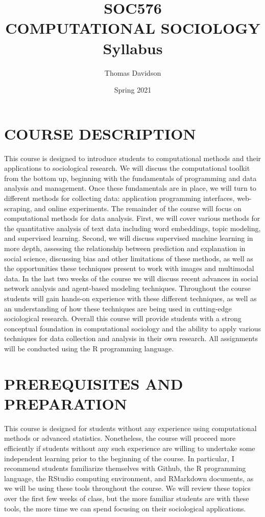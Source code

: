 \documentclass[
  10pt,
]{article}
\title{SOC576\\
\hspace*{0.333em}COMPUTATIONAL SOCIOLOGY\\
\hspace*{0.333em}Syllabus}
\author{Thomas Davidson}
\date{Spring 2021}
\begin{document}
\maketitle

\hypertarget{course-description}{%
\section{COURSE DESCRIPTION}\label{course-description}}

This course is designed to introduce students to computational methods
and their applications to sociological research. We will discuss the
computational toolkit from the bottom up, beginning with the
fundamentals of programming and data analysis and management. Once these
fundamentals are in place, we will turn to different methods for
collecting data: application programming interfaces, web-scraping, and
online experiments. The remainder of the course will focus on
computational methods for data analysis. First, we will cover various
methods for the quantitative analysis of text data including word
embeddings, topic modeling, and supervised learning. Second, we will
discuss supervised machine learning in more depth, assessing the
relationship between prediction and explanation in social science,
discussing bias and other limitations of these methods, as well as the
opportunities these techniques present to work with images and
multimodal data. In the last two weeks of the course we will discuss
recent advances in social network analysis and agent-based modeling
techniques. Throughout the course students will gain hands-on experience
with these different techniques, as well as an understanding of how
these techniques are being used in cutting-edge sociological research.
Overall this course will provide students with a strong conceptual
foundation in computational sociology and the ability to apply various
techniques for data collection and analysis in their own research. All
assignments will be conducted using the R programming language.

\hypertarget{prerequisites-and-preparation}{%
\section{PREREQUISITES AND
PREPARATION}\label{prerequisites-and-preparation}}

This course is designed for students without any experience using
computational methods or advanced statistics. Nonetheless, the course
will proceed more efficiently if students without any such experience
are willing to undertake some independent learning prior to the
beginning of the course. In particular, I recommend students familiarize
themselves with Github, the R programming language, the RStudio
computing environment, and RMarkdown documents, as we will be using
these tools throughout the course. We will review these topics over the
first few weeks of class, but the more familiar students are with these
tools, the more time we can spend focusing on their sociological
applications.
\end{document}
